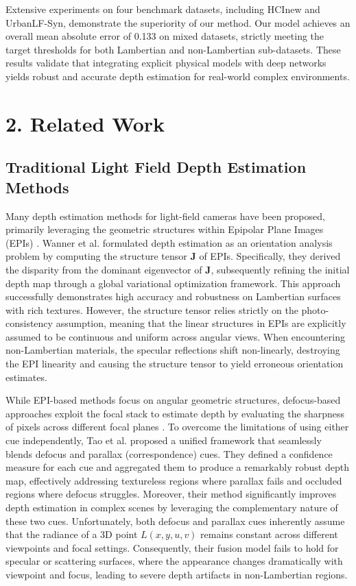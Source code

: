 \documentclass[lettersize,journal]{IEEEtran}
\begin{document}
Extensive experiments on four benchmark datasets, including HCInew and UrbanLF-Syn, demonstrate the superiority of our method. Our model achieves an overall mean absolute error of 0.133 on mixed datasets, strictly meeting the target thresholds for both Lambertian and non-Lambertian sub-datasets. These results validate that integrating explicit physical models with deep networks yields robust and accurate depth estimation for real-world complex environments.


\section{2. Related Work}

\subsection{Traditional Light Field Depth Estimation Methods}

Many depth estimation methods for light-field cameras have been proposed, primarily leveraging the geometric structures within Epipolar Plane Images (EPIs) \cite{EPIdepthestimationlightfie}. Wanner et al. \cite{WannerEPIstructuretensorgl} formulated depth estimation as an orientation analysis problem by computing the structure tensor $\mathbf{J}$ of EPIs. Specifically, they derived the disparity from the dominant eigenvector of $\mathbf{J}$, subsequently refining the initial depth map through a global variational optimization framework. This approach successfully demonstrates high accuracy and robustness on Lambertian surfaces with rich textures. However, the structure tensor relies strictly on the photo-consistency assumption, meaning that the linear structures in EPIs are explicitly assumed to be continuous and uniform across angular views. When encountering non-Lambertian materials, the specular reflections shift non-linearly, destroying the EPI linearity and causing the structure tensor to yield erroneous orientation estimates.

While EPI-based methods focus on angular geometric structures, defocus-based approaches exploit the focal stack to estimate depth by evaluating the sharpness of pixels across different focal planes \cite{defocusdepthestimationfocal}. To overcome the limitations of using either cue independently, Tao et al. \cite{Taodefocusparallaxfusionli} proposed a unified framework that seamlessly blends defocus and parallax (correspondence) cues. They defined a confidence measure for each cue and aggregated them to produce a remarkably robust depth map, effectively addressing textureless regions where parallax fails and occluded regions where defocus struggles. Moreover, their method significantly improves depth estimation in complex scenes by leveraging the complementary nature of these two cues. Unfortunately, both defocus and parallax cues inherently assume that the radiance of a 3D point $L(x,y,u,v)$ remains constant across different viewpoints and focal settings. Consequently, their fusion model fails to hold for specular or scattering surfaces, where the appearance changes dramatically with viewpoint and focus, leading to severe depth artifacts in non-Lambertian regions.
\end{document}
